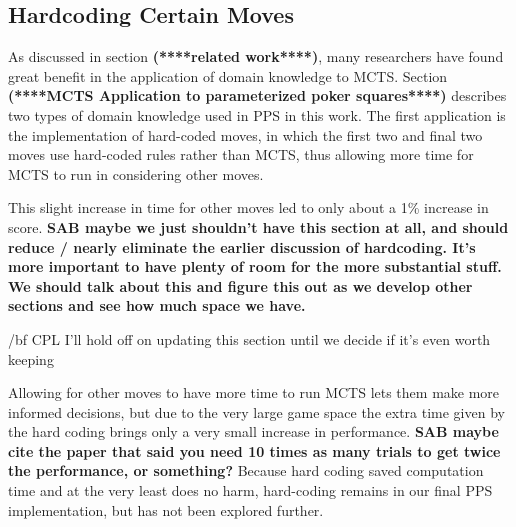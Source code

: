 \documentclass[letterpaper]{article}
\begin{document}


\subsection{Hardcoding Certain Moves}

As discussed in section {\bf (****related work****)}, many researchers have found great benefit in the application of domain knowledge to MCTS. Section {\bf (****MCTS Application to parameterized poker squares****)} describes two types of domain knowledge used in PPS in this work. The first application is the implementation of hard-coded moves, in which the first two and final two moves use hard-coded rules rather than MCTS, thus allowing more time for MCTS to run in considering other moves.


This slight increase in time for other moves led to only about a 1\% increase in score. {\bf SAB maybe we just shouldn't have this section at all, and should reduce / nearly eliminate the earlier discussion of hardcoding. It's more important to have plenty of room for the more substantial stuff. We should talk about this and figure this out as we develop other sections and see how much space we have.}

{/bf CPL I'll hold off on updating this section until we decide if it's even worth keeping}

 Allowing for other moves to have more time to run MCTS lets them make more informed decisions, but due to the very large game space the extra time given by the hard coding brings only a very small increase in performance. {\bf SAB maybe cite the paper that said you need 10 times as many trials to get twice the performance, or something?} Because hard coding saved computation time and at the very least does no harm, hard-coding remains in our final PPS implementation, but has not been explored further.
\end{document}
